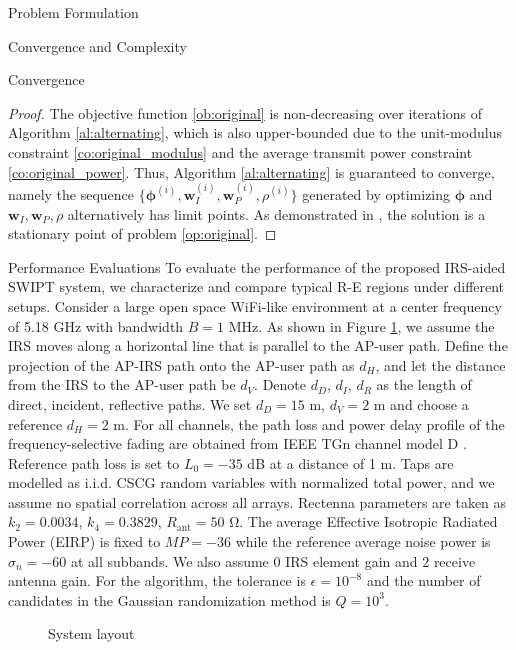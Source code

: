 \documentclass{IEEEtran}
\begin{document}
\begin{section}{Problem Formulation}
\begin{subsection}{Convergence and Complexity}
\begin{subsubsection}{Convergence}
			\begin{proof}\label{pf:ao}
				The objective function \ref{ob:original} is non-decreasing over iterations of Algorithm \ref{al:alternating}, which is also upper-bounded due to the unit-modulus constraint \ref{co:original_modulus} and the average transmit power constraint \ref{co:original_power}. Thus, Algorithm \ref{al:alternating} is guaranteed to converge, namely the sequence $\{\boldsymbol{\phi}^{(i)},\boldsymbol{w}_I^{(i)},\boldsymbol{w}_P^{(i)},\rho^{(i)}\}$ generated by optimizing $\boldsymbol{\phi}$ and $\boldsymbol{w}_I,\boldsymbol{w}_P,\rho$ alternatively has limit points. As demonstrated in \cite{Grippo2000,Hong2016,Li2013a}, the solution is a stationary point of problem \ref{op:original}.
			\end{proof}
		\end{subsubsection}
	\end{subsection}
\end{section}

\begin{section}{Performance Evaluations}
	To evaluate the performance of the proposed IRS-aided SWIPT system, we characterize and compare typical R-E regions under different setups. Consider a large open space WiFi-like environment at a center frequency of 5.18 \si{GHz} with bandwidth $B=1$ \si{MHz}. As shown in Figure \ref{fi:layout}, we assume the IRS moves along a horizontal line that is parallel to the AP-user path. Define the projection of the AP-IRS path onto the AP-user path as $d_H$, and let the distance from the IRS to the AP-user path be $d_V$. Denote $d_D$, $d_I$, $d_R$ as the length of direct, incident, reflective paths. We set $d_D=15$ \si{\meter}, $d_V=2$ \si{\meter} and choose a reference $d_H=2$ \si{\meter}. For all channels, the path loss and power delay profile of the frequency-selective fading are obtained from IEEE TGn channel model D \cite{Erceg2004}. Reference path loss is set to $L_0=-35$ \si{\dB} at a distance of 1 \si{\meter}. Taps are modelled as i.i.d. CSCG random variables with normalized total power, and we assume no spatial correlation across all arrays. Rectenna parameters are taken as $k_2=0.0034$, $k_4=0.3829$, $R_{\text{ant}}=50$ \si{\ohm}. The average Effective Isotropic Radiated Power (EIRP) is fixed to $MP=-36$ \si{\dBi} while the reference average noise power is $\sigma_n=-60$ \si{\dBm} at all subbands. We also assume 0 \si{\dBi} IRS element gain and 2 \si{\dBi} receive antenna gain. For the algorithm, the tolerance is $\epsilon=10^{-8}$ and the number of candidates in the Gaussian randomization method is $Q=10^{3}$.

	\begin{figure}
		\centering
		\def\svgwidth{\columnwidth}
		
		\caption{System layout}
		\label{fi:layout}
	\end{figure}
\end{section}



\end{document}
